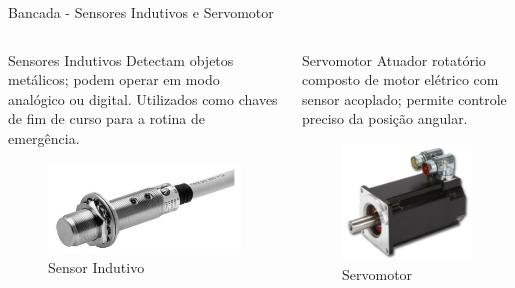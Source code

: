 \documentclass[10pt]{beamer}
\begin{document}
\begin{frame}[fragile]{Bancada - Sensores Indutivos e Servomotor}

\begin{columns}[T]

\begin{column}{.5\textwidth}

\begin{block}{Sensores Indutivos}
Detectam objetos metálicos; podem operar em modo analógico ou digital. Utilizados como chaves de fim de curso para a rotina de emergência.
\end{block}

\begin{figure}[!ht]
	\centering
	\includegraphics[width=.6\linewidth]{figures/fundamentos/sensorIndutivo}
	\caption{Sensor Indutivo\cite{redytton}}
	\label{bancadaindut}
\end{figure}

\end{column}

\begin{column}{.5\textwidth}

\begin{block}{Servomotor}
Atuador rotatório composto de motor elétrico com sensor acoplado; permite controle preciso da posição angular.
\end{block}

\begin{figure}[!ht]
	\centering
	\includegraphics[width=.5\linewidth]{figures/fundamentos/servomotor}
	\caption{Servomotor\cite{redytton}}
	\label{bancadaservo}
\end{figure}

\end{column}

\end{columns}

\end{frame}
\end{document}
